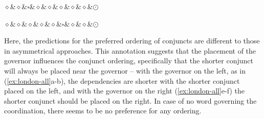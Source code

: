 \begin{multicols}{2}
\begin{exe}
\begin{xlist}
\ex
\begin{dependency}[theme = simple, baseline=-\the\dimexpr\fontdimen22\textfont2\relax]
    \begin{deptext}
        $\diamond$\&$\diamond$\&$\square$\&$\diamond$\&$\diamond$\&$\diamond$\&$\diamond$\&$\diamond$\&$\odot$\\
    \end{deptext}
\end{dependency}

\ex
\begin{dependency}[theme = simple, baseline=-\the\dimexpr\fontdimen22\textfont2\relax]
    \begin{deptext}
        $\diamond$\&$\diamond$\&$\diamond$\&$\diamond$\&$\diamond$\&$\square$\&$\diamond$\&$\diamond$\&$\odot$\\
    \end{deptext}
\end{dependency}
\end{xlist}
\end{exe}
\end{multicols}

Here, the predictions for the preferred ordering of conjuncts are different to those in asymmetrical approaches. This annotation suggests that the placement of the governor influences the conjunct ordering, specifically that the shorter conjunct will always be placed near the governor -- with the governor on the left, as in (\ref{ex:london-all}a-b), the dependencies are shorter with the shorter conjunct placed on the left, and with the governor on the right (\ref{ex:london-all}e-f) the shorter conjunct should be placed on the right. In case of no word governing the coordination, there seems to be no preference for any ordering.